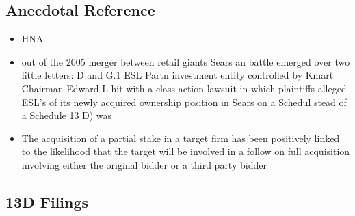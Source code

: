 \documentclass[12pt]{article}
\begin{document}
\subsection{Anecdotal Reference}

    \begin{itemize}
        \item HNA
        \item out of the 2005 merger between retail giants Sears an battle emerged over two little letters: D and G.1 ESL Partn investment entity controlled by Kmart Chairman Edward L hit with a class action lawsuit in which plaintiffs alleged ESL's of its newly acquired ownership position in Sears on a Schedul stead of a Schedule 13 D) was \citep{Giglia2018}

        \item The acquisition of a partial stake in a target firm has been positively linked to the likelihood that the target will be involved in a follow on full acquisition involving either the original bidder or a third party bidder \citep{Akhigbe2007}

        

    \end{itemize}

\subsection{13D Filings}
\end{document}
